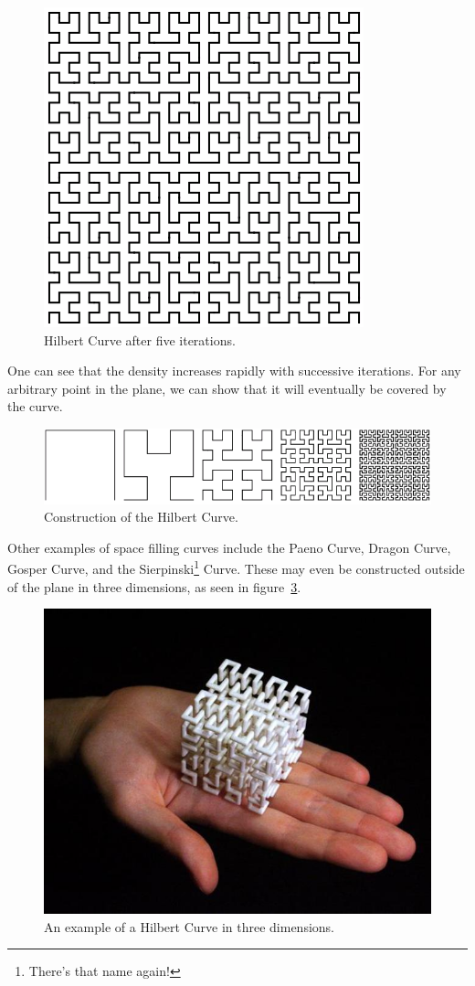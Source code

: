 \documentclass[jou,apacite]{apa6}
\begin{document}
\begin{figure}[htpb]
  \centering
  \includegraphics[width=0.75\columnwidth]{images/hilbert.png}
  \caption{Hilbert Curve after five iterations.}
  \label{fig:hilbert}
\end{figure}

One can see that the density increases rapidly with successive iterations.  For any arbitrary point in the plane, we can show that it will eventually be covered by the curve.

\begin{figure}[htpb]
  \centering
  \includegraphics[width=0.75\columnwidth]{images/hilbert2.png}
  \caption{Construction of the Hilbert Curve.}
  \label{fig:hilbert2}
\end{figure}

Other examples of space filling curves include the Paeno Curve, Dragon Curve, Gosper Curve, and the Sierpinski\footnote{There's that name again!} Curve.   These may even be constructed outside of the plane in three dimensions, as seen in figure~\ref{fig:hilbert3d}.

\begin{figure}[htpb]
  \centering
  \includegraphics[width=0.75\columnwidth]{images/hilbert3d.jpg}
  \caption{An example of a Hilbert Curve in three dimensions.}
  \label{fig:hilbert3d}
\end{figure}
\end{document}

